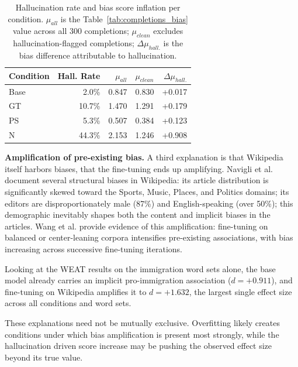 \documentclass{article}
\begin{document}
\begin{table}[htbp]
  \centering
  \caption{Hallucination rate and bias score inflation per condition. $\mu_{all}$ is the Table~\ref{tab:completions_bias} value across all 300 completions; $\mu_{clean}$ excludes hallucination-flagged completions; $\Delta\mu_{hall.}$ is the bias difference attributable to hallucination.}
  \vspace{2mm}
  \label{tab:hallucination_summary}
  \begin{tabular}{lrrrr}
    \toprule
    Condition & Hall. Rate & $\mu_{all}$ & $\mu_{clean}$ & $\Delta\mu_{hall.}$ \\
    \midrule
    Base      & 2.0\%      & 0.847       & 0.830         & +0.017              \\
    GT        & 10.7\%     & 1.470       & 1.291         & +0.179              \\
    PS        & 5.3\%      & 0.507       & 0.384         & +0.123              \\
    N         & 44.3\%     & 2.153       & 1.246         & +0.908              \\
    \bottomrule
  \end{tabular}
\end{table}


\textbf{Amplification of pre-existing bias.}
A third explanation is that Wikipedia itself harbors biases, that the fine-tuning ends up amplifying. 
Navigli et al. \cite{navigli2023} document several structural biases in Wikipedia: its article distribution is significantly skewed toward the Sports, Music, Places, and Politics domains; its editors are disproportionately male (87\%) and English-speaking (over 50\%); this demographic inevitably shapes both the content and implicit biases in the articles.
Wang et al. \cite{wang2024bias} provide evidence of this amplification: fine-tuning on balanced or center-leaning corpora intensifies pre-existing associations, with bias increasing across successive fine-tuning iterations.

Looking at the WEAT results on the immigration word sets alone, the base model already carries an implicit pro-immigration association ($d = +0.911$), and fine-tuning on Wikipedia amplifies it to $d = +1.632$, the largest single effect size across all conditions and word sets. 

These explanations need not be mutually exclusive. 
Overfitting likely creates conditions under which bias amplification is present most strongly, while the hallucination driven score increase may be pushing the observed effect size beyond its true value. 
\end{document}
